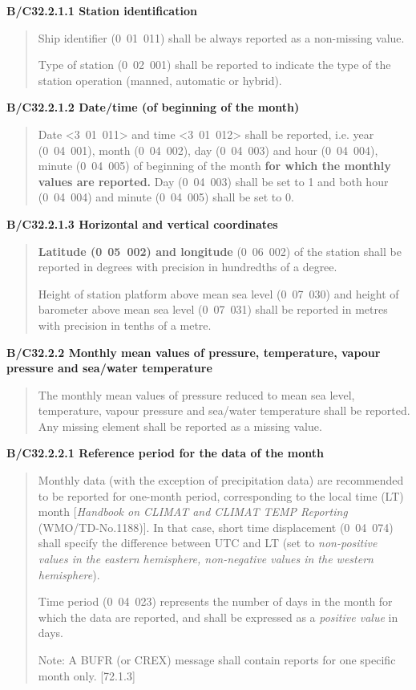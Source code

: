 \textbf{B/C32.2.1.1 Station identification}

\begin{quote}
Ship identifier (0~01~011) shall be always reported as a non-missing value.

Type of station (0~02~001) shall be reported to indicate the type of the station operation (manned, automatic or hybrid).
\end{quote}

\textbf{B/C32.2.1.2 Date/time (of beginning of the month)}

\begin{quote}
Date \textless3~01~011\textgreater{} and time \textless3~01~012\textgreater{} shall be reported, i.e. year (0~04~001), month (0~04~002), day (0~04~003) and hour (0~04~004), minute (0~04~005) of beginning of the month \textbf{for which the monthly values are reported.} Day (0~04~003) shall be set to 1 and both hour (0~04~004) and minute (0~04~005) shall be set to 0.
\end{quote}

\textbf{B/C32.2.1.3 Horizontal and vertical coordinates}

\begin{quote}
\textbf{Latitude (0}~\textbf{05~002) and longitude} (0~06~002) of the station shall be reported in degrees with precision in hundredths of a degree.

Height of station platform above mean sea level (0~07~030) and height of barometer above mean sea level (0~07~031) shall be reported in metres with precision in tenths of a metre.
\end{quote}

\textbf{B/C32.2.2 Monthly mean values of pressure, temperature, vapour pressure and sea/water temperature}

\begin{quote}
The monthly mean values of pressure reduced to mean sea level, temperature, vapour pressure and sea/water temperature shall be reported. Any missing element shall be reported as a missing value.
\end{quote}

\textbf{B/C32.2.2.1 Reference period for the data of the month}

\begin{quote}
Monthly data (with the exception of precipitation data) are recommended to be reported for one-month period, corresponding to the local time (LT) month {[}\emph{Handbook on CLIMAT and CLIMAT TEMP Reporting} (WMO/TD-No.1188){]}. In that case, short time displacement (0~04~074) shall specify the difference between UTC and LT (set to \emph{non-positive values in the eastern hemisphere, non-negative values in the western hemisphere}).

Time period (0~04~023) represents the number of days in the month for which the data are reported, and shall be expressed as a \emph{positive value} in days.

Note: A BUFR (or CREX) message shall contain reports for one specific month only. {[}72.1.3{]}
\end{quote}

